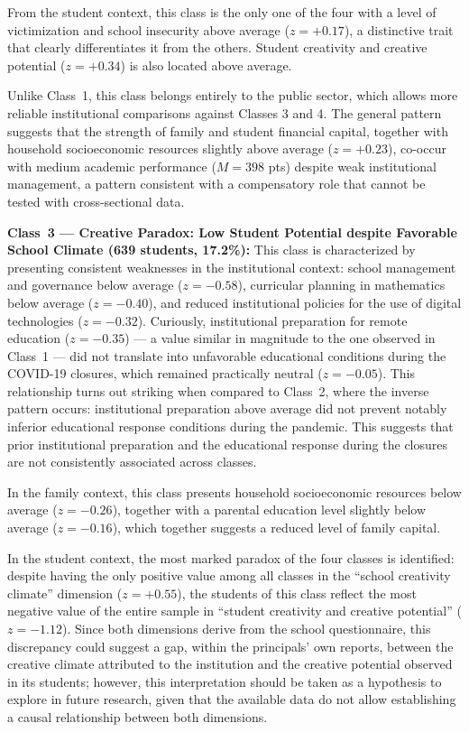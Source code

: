 \documentclass[runningheads]{llncs}
\begin{document}
From the student context, this class is the only one of the four
with a level of victimization and school insecurity above
average (\(z = +0.17\)), a distinctive trait that clearly
differentiates it from the others. Student creativity and
creative potential (\(z = +0.34\)) is also located above
average.

Unlike Class~1, this class belongs entirely to the public
sector, which allows more reliable institutional comparisons
against Classes 3 and 4. The general pattern suggests that the
strength of family and student financial capital, together with
household socioeconomic resources slightly above average
(\(z = +0.23\)), co-occur with medium academic performance
(\(M = 398\) pts) despite weak institutional management, a
pattern consistent with a compensatory role that cannot be
tested with cross-sectional data.

\textbf{Class~3 --- Creative Paradox: Low Student Potential
despite Favorable School Climate (639 students, 17.2\%):} This
class is characterized by presenting consistent weaknesses in
the institutional context: school management and governance
below average (\(z = -0.58\)), curricular planning in
mathematics below average (\(z = -0.40\)), and reduced
institutional policies for the use of digital technologies
(\(z = -0.32\)). Curiously, institutional preparation for remote
education (\(z = -0.35\)) --- a value similar in magnitude to
the one observed in Class~1 --- did not translate into
unfavorable educational conditions during the COVID-19 closures,
which remained practically neutral (\(z = -0.05\)). This
relationship turns out striking when compared to Class~2, where
the inverse pattern occurs: institutional preparation above
average did not prevent notably inferior educational response
conditions during the pandemic. This suggests that prior
institutional preparation and the educational response during
the closures are not consistently associated across classes.

In the family context, this class presents household
socioeconomic resources below average (\(z = -0.26\)), together
with a parental education level slightly below average
(\(z = -0.16\)), which together suggests a reduced level of
family capital.

In the student context, the most marked paradox of the four
classes is identified: despite having the only positive value
among all classes in the ``school creativity climate'' dimension
(\(z = +0.55\)), the students of this class reflect the most
negative value of the entire sample in ``student creativity and
creative potential'' (\(z = -1.12\)). Since both dimensions
derive from the school questionnaire, this discrepancy could
suggest a gap, within the principals' own reports, between the
creative climate attributed to the institution and the creative
potential observed in its students; however, this interpretation
should be taken as a hypothesis to explore in future research,
given that the available data do not allow establishing a causal
relationship between both dimensions.
\end{document}
